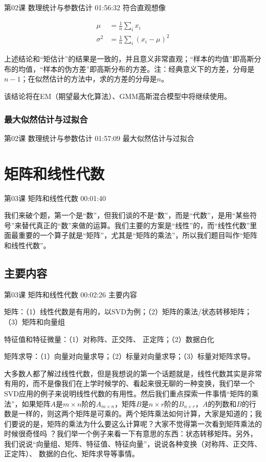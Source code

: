 \documentclass[UTF8]{ctexart}
\begin{document}
第02课 数理统计与参数估计 01:56:32 符合直观想像

\begin{equation}
\begin{aligned}
\mu &= \frac{1}{n} \sum_{i} x_{i} \\
\sigma^{2} &=\frac{1}{n}\sum_{i} (x_{i}-\mu)^{2}
\end{aligned}
\end{equation}

上述结论和“矩估计”的结果是一致的，并且意义非常直观；“样本的均值”即高斯分布的均值，“样本的伪方差”即高斯分布的方差。注：经典意义下的方差，分母是$n-1$；在似然估计的方法中，求的方差的分母是$n$。

该结论将在EM（期望最大化算法）、GMM高斯混合模型中将继续使用。

\subsubsection{最大似然估计与过拟合}

第02课 数理统计与参数估计 01:57:09 最大似然估计与过拟合

\section{矩阵和线性代数}

第03课 矩阵和线性代数 00:01:40

我们来破个题，第一个是“数”，但我们谈的不是“数”，而是“代数”，是用“某些符号”来替代真正的“数”来做的运算。我们主要的方案是“线性”的，而“线性代数”里面最重要的一个算子就是“矩阵”，尤其是“矩阵的乘法”，所以我们题目叫作“矩阵和线性代数”。

\subsection{主要内容}

第03课 矩阵和线性代数 00:02:26 主要内容

矩阵：（1）线性代数是有用的，以SVD为例；（2）矩阵的乘法/状态转移矩阵；（3）矩阵和向量组

特征值和特征微量：（1）对称阵、正交阵、 正定阵；（2）数据白化

矩阵求导：（1）向量对向量求导；（2）标量对向量求导；（3）标量对矩阵求导。

大多数人都了解过线性代数，但是我想说的第一个话题就是，线性代数其实是非常有用的，而不是像我们在上学时候学的、看起来很无聊的一种变换，我们举一个SVD应用的例子来说明线性代数的有用性。然后我们重点探索一件事情“矩阵的乘法”，如果矩阵$A$是$m\times n$阶的$A_{m \times n}$，矩阵$B$是$n \times r$阶的$B_{n \times r}$，$A$的列数和$B$的行数是一样的，则这两个矩阵是可乘的。两个矩阵乘法如何计算，大家是知道的；我们要说的是，矩阵的乘法为什么要这么计算呢？大家不觉得第一次看到矩阵乘法的时候很奇怪吗 ？我们举一个例子来看一下有意思的东西：状态转移矩阵。另外，我们说说“向量组、矩阵、特征值、特征向量”，说说各种变换（对称阵、正交阵、正定阵）、 数据的白化、矩阵求导等事情。
\end{document}
